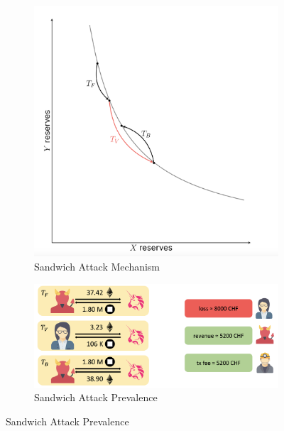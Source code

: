 \documentclass{article}
\begin{document}
\begin{figure}[htbp]
    \centering
    \begin{subfigure}[b]{0.4\textwidth}
        \centering
        \includegraphics[width=\textwidth]{Bildschirmfoto 2024-04-02 um 16.56.24.png}
        \caption{Sandwich Attack Mechanism}
        \label{fig:img1}
    \end{subfigure}
    \hfill
    \begin{subfigure}[b]{0.4\textwidth}
        \centering
        \includegraphics[width=\textwidth]{Bildschirmfoto 2024-04-02 um 16.56.55.png}
        \caption{Sandwich Attack Prevalence}
        \label{fig:img2}
    \end{subfigure}
    \label{fig:both}
\end{figure}
\end{document}
